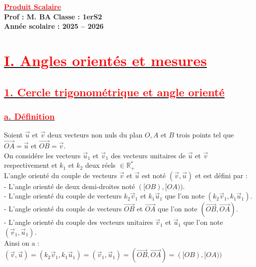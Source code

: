 \documentclass[12pt,a4paper]{article}
\begin{document}
\begin{center}
    \Large\textbf{\underline{\textcolor{red}{Produit Scalaire}}}\\[-0.1cm]
    \normalsize\textbf{Prof : M. BA} \hfill \textbf{Classe : 1erS2}\\[-0.1cm]
    \textbf{Année scolaire : 2025 -- 2026}
\end{center}
\section*{\underline{\textbf{\textcolor{red}{I. Angles orientés et mesures}}}}
\subsection*{\underline{\textbf{\textcolor{red}{1. Cercle trigonométrique et angle orienté }}}}
\subsubsection*{\underline{\textbf{\textcolor{red}{a. Définition }}}}

Soient $\vec{u}$ et $\vec{v}$ deux vecteurs non nuls du plan $O, A$ et $B$ trois points tel que $\overrightarrow{OA}=\vec{u}$ et $\overrightarrow{OB}=\vec{v}$.\\
On considére les vecteurs $\vec{u}_1$ et $\vec{v}_1$ des vecteurs unitaires de $\vec{u}$ et $\vec{v}$ respectivement et $k_1$ et $k_2$ deux réels $\in \mathbb{R}^*_+$\\
L'angle orienté du couple de vecteurs $\vec{v}$ et $\vec{u}$ est noté $(\vec{v}, \vec{u})$ et est défini par :\\
- L'angle orienté de deux demi-droites noté $([OB), [OA))$.\\
- L'angle orienté du couple de vecteurs $k_2 \vec{v}_1$ et $k_1 \vec{u}_1$ que l'on note $(k_2 \vec{v}_1, k_1 \vec{u}_1)$.\\
- L'angle orienté du couple de vecteurs $\overrightarrow{OB}$ et $\overrightarrow{OA}$ que l'on note $(\overrightarrow{OB}, \overrightarrow{OA})$.\\
- L'angle orienté du couple des vecteurs unitaires $\vec{v}_1$ et $\vec{u}_1$ que l'on note $(\vec{v}_1, \vec{u}_1)$.\\
Ainsi on a : $(\vec{v}, \vec{u}) = (k_2 \vec{v}_1, k_1 \vec{u}_1) = (\vec{v}_1, \vec{u}_1) = (\overrightarrow{OB}, \overrightarrow{OA}) = ([OB), [OA))$
\end{document}
